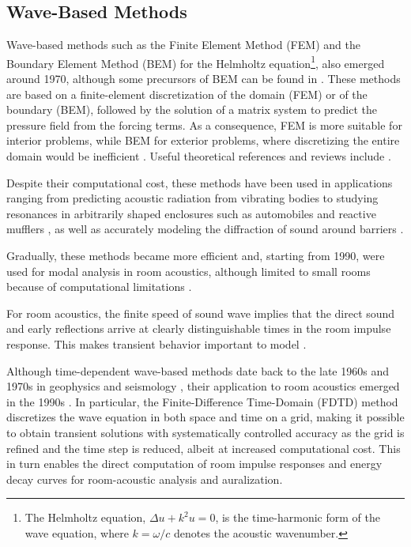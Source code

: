 \documentclass{Configuration_Files/PoliMi3i_thesis}
\newif\ifshowthesischanges
\DeclareRobustCommand{\thesischange}[2]{%
    \ifshowthesischanges
        \textcolor{#1}{#2}%
    \else
        #2%
    \fi
}
\def\thesischange#1#2{#2}%
\begin{document}
\subsection{Wave-Based Methods}
Wave-based methods such as the Finite Element Method (FEM) and the Boundary Element Method (BEM) for the Helmholtz equation\footnote{\thesischange{red}{The Helmholtz equation, $\Delta u + k^2 u = 0$, is the time-harmonic form of the wave equation, where $k = \omega/c$ denotes the acoustic wavenumber.}}, also emerged around 1970, although some precursors of BEM can be found in \cite{chen_sound_1963,chertock_sound_1964,copley_integral_1967,schenck_improved_1968}. These methods are based on a finite-element discretization of the domain (FEM) or of the boundary (BEM), followed by the solution of a matrix system to predict the pressure field from the forcing terms. As a consequence, FEM is more suitable for interior problems, while BEM for exterior problems, where discretizing the entire domain would be inefficient \citep{filippi_theoretical_1983}. Useful theoretical references and reviews include \cite{filippi_theoretical_1983,seybert_review_1985,kipp_prediction_1985,ihlenburg_finite_1995}.

Despite their computational cost, these methods have been used in applications ranging from predicting acoustic radiation from vibrating bodies to studying resonances in arbitrarily shaped enclosures such as automobiles and reactive mufflers \citep{craggs_use_1972,shuku_analysis_1973,petyt_finite_1976,kagawa_finiteelement_1976,joppa_finite_1978,richards_simplified_1979,cederfeldt_use_1982,nefske_application_1984}, as well as accurately modeling the diffraction of sound around barriers \citep{seznec_diffraction_1980}.

Gradually, these methods became more efficient and, starting from 1990, were used for modal analysis in room acoustics, although limited to small rooms because of computational limitations \citep{rindel_computer_1992}.

For room acoustics, the finite speed of sound wave implies that the direct sound and early reflections arrive at clearly distinguishable times in the room impulse response. This makes transient behavior important to model \citep{funkhouser_beam_1998}.

\thesischange{blue}{Although time-dependent wave-based methods date back to the late 1960s and 1970s in geophysics and seismology \citep{alterman_propagation_1968,ottaviani_elastic-wave_1971,alford_accuracy_1974}, their application to room acoustics emerged in the 1990s \citep{botteldooren_finitedifference_1995}. In particular, the Finite-Difference Time-Domain (FDTD) method discretizes the wave equation in both space and time on a grid, making it possible to obtain transient solutions with systematically controlled accuracy as the grid is refined and the time step is reduced, albeit at increased computational cost. This in turn enables the direct computation of room impulse responses and energy decay curves for room-acoustic analysis and auralization.}
\end{document}
